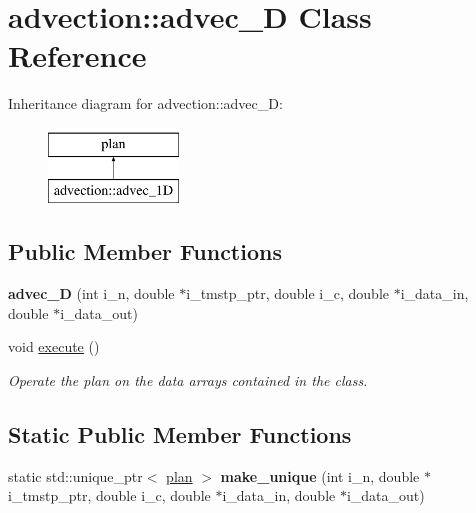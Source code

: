 \hypertarget{classadvection_1_1advec__1_d}{\section{advection\-:\-:advec\-\_\-D Class Reference}
\label{classadvection_1_1advec__1_d}
}
Inheritance diagram for advection\-:\-:advec\-\_\-D\-:\begin{figure}[H]
\begin{center}
\leavevmode
\includegraphics[height=2.000000cm]{classadvection_1_1advec__1_d}
\end{center}
\end{figure}
\subsection*{Public Member Functions}
\begin{DoxyCompactItemize}
\item 
\hypertarget{classadvection_1_1advec__1_d_a2af69d63e9797a9594130e086924419a}{{\bfseries advec\-\_\-D} (int i\-\_\-n, double $\ast$i\-\_\-tmstp\-\_\-ptr, double i\-\_\-c, double $\ast$i\-\_\-data\-\_\-in, double $\ast$i\-\_\-data\-\_\-out)}\label{classadvection_1_1advec__1_d_a2af69d63e9797a9594130e086924419a}

\item 
void \hyperlink{classadvection_1_1advec__1_d_a9d4d3fb973c1ecc8c1dbd5f4f191b112}{execute} ()
\begin{DoxyCompactList}\small\item\em Operate the plan on the data arrays contained in the class. \end{DoxyCompactList}\end{DoxyCompactItemize}
\subsection*{Static Public Member Functions}
\begin{DoxyCompactItemize}
\item 
\hypertarget{classadvection_1_1advec__1_d_a8d3aacaa43fc555f1f3942dd374e1ab6}{static std\-::unique\-\_\-ptr$<$ \hyperlink{classplan}{plan} $>$ {\bfseries make\-\_\-unique} (int i\-\_\-n, double $\ast$i\-\_\-tmstp\-\_\-ptr, double i\-\_\-c, double $\ast$i\-\_\-data\-\_\-in, double $\ast$i\-\_\-data\-\_\-out)}\label{classadvection_1_1advec__1_d_a8d3aacaa43fc555f1f3942dd374e1ab6}

\end{DoxyCompactItemize}
